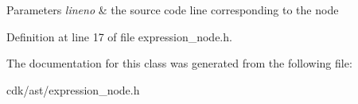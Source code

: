 \begin{DoxyParams}{Parameters}
{\em lineno} & the source code line corresponding to the node \\
\hline
\end{DoxyParams}


Definition at line 17 of file expression\+\_\+node.\+h.



The documentation for this class was generated from the following file\+:\begin{DoxyCompactItemize}
\item 
cdk/ast/expression\+\_\+node.\+h\end{DoxyCompactItemize}
